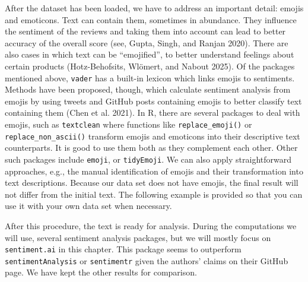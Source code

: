 After the dataset has been loaded, we have to address an important detail:
emojis and emoticons. Text can contain them, sometimes in abundance. They influence the sentiment of the reviews and taking them into account can
lead to better accuracy of the overall score (see, Gupta, Singh,
and Ranjan 2020). There are also cases in which text can be
``emojified'', to better understand feelings about certain products
(Hotz-Behofsits, Wlömert, and Nabout 2025). Of the packages mentioned above,
\texttt{vader} has a built-in lexicon which links emojis to sentiments.
Methods have been proposed, though, which calculate sentiment analysis
from emojis by using tweets and GitHub posts containing emojis to
better classify text containing them (Chen et al. 2021). In R, there are several packages to deal with emojis, such as \texttt{textclean}
where functions like \texttt{replace\_emoji()} or
\texttt{replace\_non\_ascii()} transform emojis and emoticons into
their descriptive text counterparts. It is good to use them both as they
complement each other. Other such packages include \texttt{emoji}, or
\texttt{tidyEmoji}. We can also apply straightforward approaches, e.g., the manual identification of emojis and their transformation into text
descriptions. Because our data set does not have emojis, the final result
will not differ from the initial text. The following
example is provided so that you can use it
with your own data set when necessary.

\begin{Shaded}
\begin{Highlighting}[]

\SpecialCharTok{$}\OtherTok{\textless{}{-}} \SpecialCharTok{$}

\SpecialCharTok{$}\OtherTok{\textless{}{-}} \SpecialCharTok{$}
\end{Highlighting}
\end{Shaded}

After this procedure, the text is ready for analysis. During the
computations we will use, several sentiment analysis packages, but
we will mostly focus on \texttt{sentiment.ai} in this chapter. This package seems to outperform \texttt{sentimentAnalysis} or
\texttt{sentimentr} given the authors' claims on their GitHub page. We
have kept the other results for comparison.

